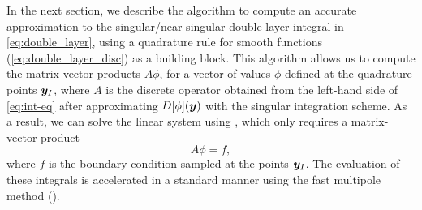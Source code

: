 In the next section, we describe the algorithm to compute an accurate approximation to the singular/near-singular double-layer integral in \cref{eq:double_layer}, using a quadrature rule for smooth functions (\cref{eq:double_layer_disc}) as a building block. 
This algorithm allows us to compute the matrix-vector products $A\phi$, for a vector of values $\phi$ defined at the quadrature points ${\bm{y}}_I$, where $A$ is the discrete operator obtained from the left-hand side of \cref{eq:int-eq} after approximating $D[\phi]({\bm{y}})$ with the singular integration scheme.
As a result, we can solve the linear system using \gmres, which only requires a matrix-vector product 
\begin{equation}
  A\phi = f,
  \label{eq:linear_system}
\end{equation}
where $f$ is the boundary condition sampled at the points ${\bm{y}}_I$. The evaluation of these integrals is accelerated in a standard manner using the fast multipole method (\fmm)\cite{MB,ying2004kernel,greengard1987fast}.


